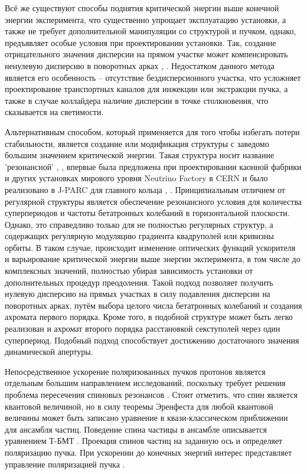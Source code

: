 \par Всё же существуют способы поднятия критической энергии выше конечной энергии эксперимента, что существенно упрощает эксплуатацию установки, а также не требует дополнительной манипуляции со структурой и пучком, однако, предъявляет особые условия при проектировании установки. Так, создание отрицательного значения дисперсии на прямом участке может компенсировать ненулевую дисперсию в поворотных арках \cite{pi_trans}, \cite{wo_trans}. Недостатком данного метода является его особенность -- отсутствие бездисперсионного участка, что усложняет проектирование транспортных каналов для инжекции или экстракции пучка, а также в случае коллайдера наличие дисперсии в точке столкновения, что сказывается на светимости.

\par Альтернативным способом, который применяется для того чтобы избегать потери стабильности, является создание или модификация структуры с заведомо большим значением критической энергии. Такая структура носит название 'резонансной' \cite{senichev:resonant}, \cite{senichev:construction}, впервые была предложена при проектировании каонной фабрики \cite{kaon_tr} и других установках мирового уровня Neutrino Factory в CERN \cite{neutrino_tr} и было реализовано в J-PARC для главного кольца \cite{JHP_tr}, \cite{J-PARK_tr}. Принципиальным отличием от регулярной структуры является обеспечение резонансного условия для количества суперпериодов и частоты бетатронных колебаний в горизонтальной плоскости. Однако, это справедливо только для не полностью регулярных структур, а содержащих регулярную модуляцию градиента квадруполей или кривизны орбиты. В таком случае, происходит изменение оптических функций ускорителя и варьирование критической энергии выше энергии эксперимента, в том числе до комплексных значений, полностью убирая зависимость установки от дополнительных процедур преодоления. Такой подход позволяет получить нулевую дисперсию на прямых участках в силу подавления дисперсии на поворотных арках, путём выбора целого числа бетатронных колебаний и создания ахромата первого порядка. Кроме того, в подобной структуре может быть легко реализован и ахромат второго порядка расстановкой секступолей через один суперпериод. Подобный подход способствует достижению достаточного значения динамической апертуры.

\par Непосредственное ускорение поляризованных пучков протонов является отдельным большим направлением исследований, поскольку требует решения проблема пересечения спиновых резонансов \cite{spin_res}. Стоит отметить, что спин является квантовой величиной, но в силу теоремы Эренфеста для любой квантовой величины может быть записано уравнение в квази-классическом приближении для ансамбля частиц. Поведение спина частицы в ансамбле описывается уравнением Т-БМТ \cite{TBMT}. Проекция спинов частиц на заданную ось и определяет поляризацию пучка. При ускорении до конечных энергий интерес представляет управление поляризацией пучка \cite{ST_Filatov}.

